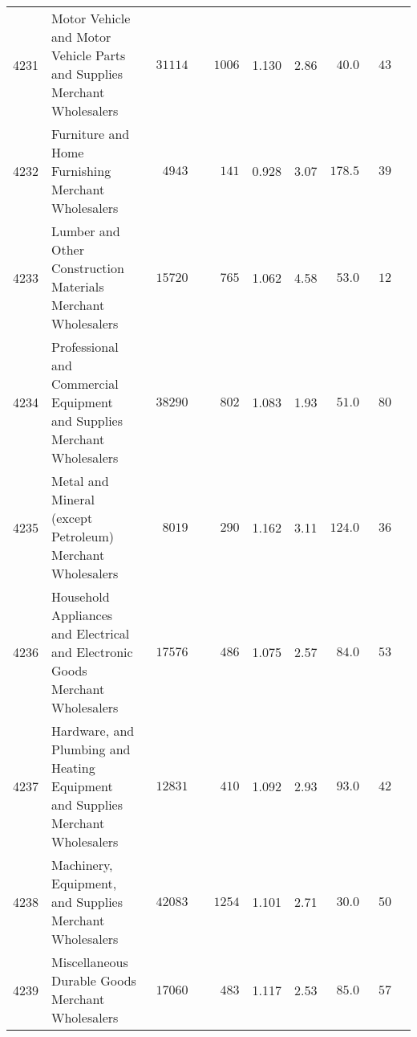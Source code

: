\documentclass[9pt, oneside]{article}   	%
\begin{document}
\begin{longtable}{lp{3 in}ccccccc}
4231  & Motor Vehicle and Motor Vehicle Parts and Supplies Merchant Wholesalers & $\phantom{0}31114$ & $\phantom{00}1006$ & 1.130 &  2.86 & $\phantom{0}40.0$ & $\phantom{0}43$ \\
4232  & Furniture and Home Furnishing Merchant Wholesalers & $\phantom{00}4943$ & $\phantom{000}141$ & 0.928 &  3.07 & $178.5$ & $\phantom{0}39$ \\
4233  & Lumber and Other Construction Materials Merchant Wholesalers & $\phantom{0}15720$ & $\phantom{000}765$ & 1.062 &  4.58 & $\phantom{0}53.0$ & $\phantom{0}12$ \\
4234  & Professional and Commercial Equipment and Supplies Merchant Wholesalers & $\phantom{0}38290$ & $\phantom{000}802$ & 1.083 &  1.93 & $\phantom{0}51.0$ & $\phantom{0}80$ \\
4235  & Metal and Mineral (except Petroleum) Merchant Wholesalers & $\phantom{00}8019$ & $\phantom{000}290$ & 1.162 &  3.11 & $124.0$ & $\phantom{0}36$ \\
4236  & Household Appliances and Electrical and Electronic Goods Merchant Wholesalers & $\phantom{0}17576$ & $\phantom{000}486$ & 1.075 &  2.57 & $\phantom{0}84.0$ & $\phantom{0}53$ \\
4237  & Hardware, and Plumbing and Heating Equipment and Supplies Merchant Wholesalers & $\phantom{0}12831$ & $\phantom{000}410$ & 1.092 &  2.93 & $\phantom{0}93.0$ & $\phantom{0}42$ \\
4238  & Machinery, Equipment, and Supplies Merchant Wholesalers & $\phantom{0}42083$ & $\phantom{00}1254$ & 1.101 &  2.71 & $\phantom{0}30.0$ & $\phantom{0}50$ \\
4239  & Miscellaneous Durable Goods Merchant Wholesalers & $\phantom{0}17060$ & $\phantom{000}483$ & 1.117 &  2.53 & $\phantom{0}85.0$ & $\phantom{0}57$ \\


\end{longtable}
\end{document}
